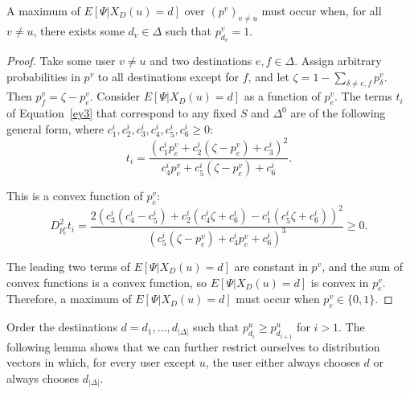 \documentclass[prodmode,acmtissec]{acmsmall}
\begin{document}
\begin{lemma} \label{vertex}
  A maximum of $E[\Psi | X_D(u)=d]$ over $(p^v)_{v\neq u}$ must occur when, for all $v\neq u$, there exists some $d_v\in \Delta$ such that $p^v_{d_v}=1$.
\end{lemma}
\begin{proof}
Take some user $v\neq u$ and two destinations $e,f\in \Delta$.  Assign arbitrary probabilities in $p^v$ to all destinations except for $f$, and let $\zeta=1-\sum_{\delta \neq e,f}p^v_{\delta}$.  Then $p^v_f = \zeta -p^v_e$.  Consider $E[\Psi | X_D(u)=d]$ as a function of $p^v_e$.  The terms $t_i$ of Equation~\ref{ey3} that correspond to any fixed $S$ and $\Delta^0$ are of the following general form, where $c_1^i, c_2^i, c_3^i, c_4^i, c_5^i, c_6^i \ge 0$:
\begin{displaymath}
t_i = \frac{(c_1^i p^v_e + c_2^i({\zeta}-p^v_e)+c_3^i)^2}{c_4^i p^v_e + c_5^i (\zeta-p^v_e) + c_6^i}.
\end{displaymath}

This is a convex function of $p^v_e$:
\begin{displaymath}
D^2_{p_e^v} t_i = \frac{2(c_3^i(c_4^i-c_5^i)+c_2^i(c_4^i \zeta+c_6^i)-c_1^i(c_5^i \zeta+c_6^i))^2}{(c_5^i(\zeta-p^v_e)+c_4^i p^v_e+c_6^i)^3} \ge 0.
\end{displaymath}

The leading two terms of $E[\Psi | X_D(u)=d]$ are constant in $p^v$, and the sum of convex functions is a convex function, so $E[\Psi | X_D(u)=d]$ is convex in $p^v_e$.  Therefore, a maximum of $E[\Psi | X_D(u)=d]$ must occur when $p^v_e\in \{0,1\}$.\hfill\end{proof}

Order the destinations $d=d_1,\ldots ,d_{|\Delta|}$ such that $p^u_{d_i}\ge p^u_{d_{i+1}}$ for $i>1$.  The following lemma shows that we can further restrict ourselves to distribution vectors in which, for every user except $u$, the user either always chooses $d$ or always chooses $d_{|\Delta|}$.
\end{document}
